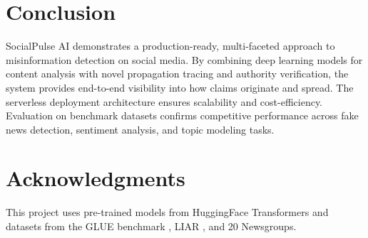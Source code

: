 \documentclass[12pt,a4paper]{article}
\begin{document}
\section{Conclusion}
SocialPulse AI demonstrates a production-ready, multi-faceted approach to misinformation detection on social media. By combining deep learning models for content analysis with novel propagation tracing and authority verification, the system provides end-to-end visibility into how claims originate and spread. The serverless deployment architecture ensures scalability and cost-efficiency. Evaluation on benchmark datasets confirms competitive performance across fake news detection, sentiment analysis, and topic modeling tasks.

\section*{Acknowledgments}
This project uses pre-trained models from HuggingFace Transformers \cite{wolf2020} and datasets from the GLUE benchmark \cite{wang2018}, LIAR \cite{rashkin2017}, and 20 Newsgroups.
\end{document}
